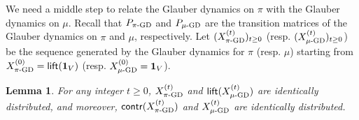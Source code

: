\documentclass[11pt,a4paper]{article}
\newtheorem{lemma}[theorem]{Lemma}
\theoremstyle{definition}
\def\*#1{\mathbf{#1}} %
\begin{document}
We need a middle step to relate the Glauber dynamics on $\pi$ with the Glauber dynamics on $\mu$. 
Recall that $P_{\pi\textnormal{-GD}}$ and $P_{\mu\textnormal{-GD}}$ are the transition matrices of the Glauber dynamics on $\pi$ and $\mu$, respectively. 
Let $(X^{(t)}_{\textnormal{$\pi$-GD}})_{t \geq 0}$ (resp. $(X^{(t)}_{\textnormal{$\mu$-GD}})_{t \geq 0}$) be the sequence generated by the Glauber dynamics for $\pi$ (resp. $\mu$) starting from $X^{(0)}_{\textnormal{$\pi$-GD}} = \textsf{lift}(\*1_V)$ (resp. $X^{(0)}_{\textnormal{$\mu$-GD}} = \*1_V$).
\begin{lemma}\label{lem:comparison-lifted}
    For any integer $t \geq 0$, $X^{(t)}_{\textnormal{$\pi$-GD}}$ and $\textnormal{\textsf{lift}}(X^{(t)}_{\textnormal{$\mu$-GD}})$ are identically distributed, and moreover, $\textnormal{\textsf{contr}}(X^{(t)}_{\textnormal{$\pi$-GD}})$ and $X^{(t)}_{\textnormal{$\mu$-GD}}$ are identically distributed.
\end{lemma}
\end{document}
